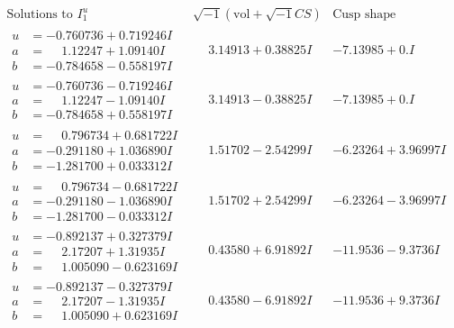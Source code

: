 \documentclass[1p]{elsarticle_modified}
\theoremstyle{definition}
\newcommand{\I}{\sqrt{-1}}
\begin{document}
$$\begin{array}{c|c|c}  
\text{Solutions to }I^u_{1}& \I (\text{vol} + \sqrt{-1}CS) & \text{Cusp shape}\\
 \hline 
\begin{aligned}
u &= -0.760736 + 0.719246 I \\
a &= \phantom{-}1.12247 + 1.09140 I \\
b &= -0.784658 - 0.558197 I\end{aligned}
 & \phantom{-}3.14913 + 0.38825 I & -7.13985 + 0. I\phantom{ +0.000000I} \\ \hline\begin{aligned}
u &= -0.760736 - 0.719246 I \\
a &= \phantom{-}1.12247 - 1.09140 I \\
b &= -0.784658 + 0.558197 I\end{aligned}
 & \phantom{-}3.14913 - 0.38825 I & -7.13985 + 0. I\phantom{ +0.000000I} \\ \hline\begin{aligned}
u &= \phantom{-}0.796734 + 0.681722 I \\
a &= -0.291180 + 1.036890 I \\
b &= -1.281700 + 0.033312 I\end{aligned}
 & \phantom{-}1.51702 - 2.54299 I & -6.23264 + 3.96997 I \\ \hline\begin{aligned}
u &= \phantom{-}0.796734 - 0.681722 I \\
a &= -0.291180 - 1.036890 I \\
b &= -1.281700 - 0.033312 I\end{aligned}
 & \phantom{-}1.51702 + 2.54299 I & -6.23264 - 3.96997 I \\ \hline\begin{aligned}
u &= -0.892137 + 0.327379 I \\
a &= \phantom{-}2.17207 + 1.31935 I \\
b &= \phantom{-}1.005090 - 0.623169 I\end{aligned}
 & \phantom{-}0.43580 + 6.91892 I & -11.9536 - 9.3736 I \\ \hline\begin{aligned}
u &= -0.892137 - 0.327379 I \\
a &= \phantom{-}2.17207 - 1.31935 I \\
b &= \phantom{-}1.005090 + 0.623169 I\end{aligned}
 & \phantom{-}0.43580 - 6.91892 I & -11.9536 + 9.3736 I \\ \hline\begin{aligned}

\end{aligned}
\end{array}$$
\end{document}
